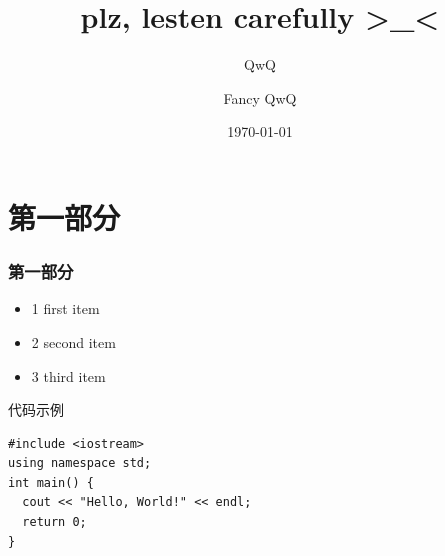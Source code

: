\documentclass{ldr-simple-gray}
\title{plz, lesten carefully >\_<}
\subtitle{QwQ}
\author{Fancy QwQ}
\institute[] {
  23电信基地班\\
  兰州大学算法与程序设计集训队
}
\date{\today}
\begin{document}
  \frame{\titlepage} %

  \section{第一部分}
  \begin{frame}
    \frametitle{第一部分}
    \begin{itemize}
      \item 1 first item
      \item 2 second item
      \item 3 third item
    \end{itemize}
  \end{frame}

  \begin{frame}[fragile]{代码示例}
    \begin{verbatim}
#include <iostream>
using namespace std;
int main() {
  cout << "Hello, World!" << endl;
  return 0;
}
    \end{verbatim}
  \end{frame}
\end{document}
